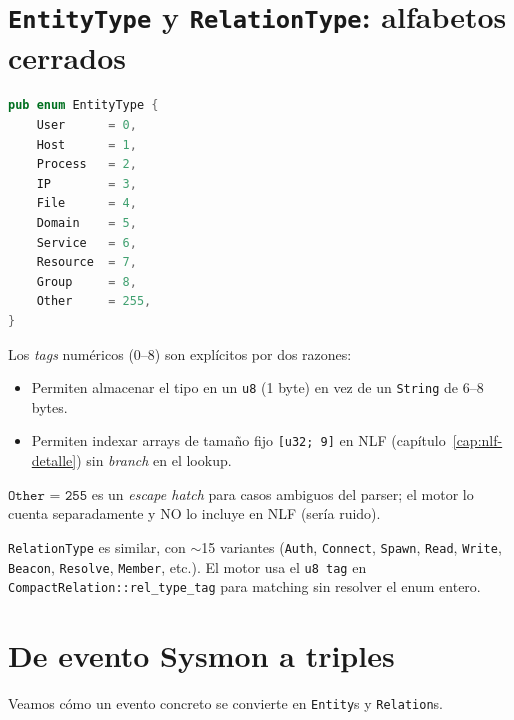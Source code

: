 \section{\texttt{EntityType} y \texttt{RelationType}: alfabetos
cerrados}

\begin{lstlisting}[language=Rust]
pub enum EntityType {
    User      = 0,
    Host      = 1,
    Process   = 2,
    IP        = 3,
    File      = 4,
    Domain    = 5,
    Service   = 6,
    Resource  = 7,
    Group     = 8,
    Other     = 255,
}
\end{lstlisting}

Los \emph{tags} numéricos (0--8) son explícitos por dos razones:

\begin{itemize}
    \item Permiten almacenar el tipo en un \texttt{u8} (1 byte) en
    vez de un \texttt{String} de 6--8 bytes.
    \item Permiten indexar arrays de tamaño fijo
    \texttt{[u32; 9]} en NLF (capítulo~\ref{cap:nlf-detalle}) sin
    \emph{branch} en el lookup.
\end{itemize}

\(\texttt{Other = 255}\) es un \emph{escape hatch} para casos
ambiguos del parser; el motor lo cuenta separadamente y NO lo
incluye en NLF (sería ruido).

\texttt{RelationType} es similar, con $\sim$15 variantes
(\texttt{Auth}, \texttt{Connect}, \texttt{Spawn}, \texttt{Read},
\texttt{Write}, \texttt{Beacon}, \texttt{Resolve}, \texttt{Member},
etc.). El motor usa el \texttt{u8 tag} en
\texttt{CompactRelation::rel\_type\_tag} para matching sin resolver
el enum entero.

\section{De evento Sysmon a triples}

Veamos cómo un evento concreto se convierte en \texttt{Entity}s y
\texttt{Relation}s.

